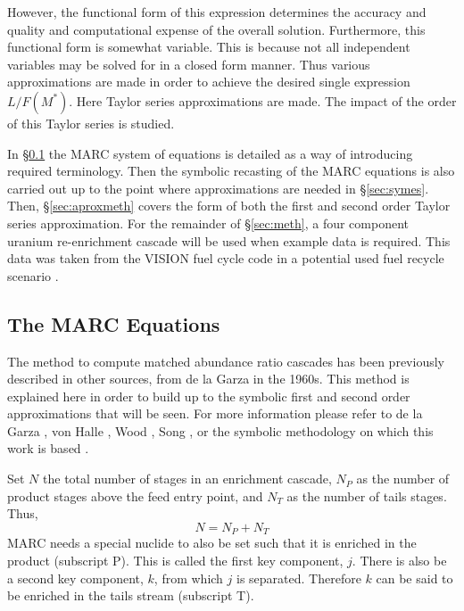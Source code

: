 \documentclass{ansconf}
\begin{document}
However, the functional form of this expression determines the accuracy and 
quality and computational expense of the overall solution.   Furthermore, this 
functional form is somewhat variable.  This is because not all independent variables
may be solved for in a closed form manner.    Thus various approximations are made 
in order to achieve the desired single expression  $L/F(M^*)$.  Here Taylor
series approximations are made.  The impact of the order of this Taylor series
is studied.

In \S \ref{sec:marceq} the MARC system of equations is detailed as a way 
of introducing required terminology. 
Then the symbolic recasting of the MARC equations is also carried out up to the
point where approximations are needed in 
\S \ref{sec:symes}.  Then, \S \ref{sec:aproxmeth} covers the form of both 
the first and second order Taylor series approximation.
For the remainder of \S \ref{sec:meth}, a four component uranium re-enrichment 
cascade will be used when example data is required.  This data was taken from the
VISION fuel cycle code in a potential used fuel recycle scenario \cite{Jacobson2009}.

\subsection{The MARC Equations}
\label{sec:marceq}

The method to compute matched abundance ratio cascades has been 
previously described in other sources, from de la Garza in the
1960s. This method is explained here in order to build up to the symbolic first and 
second order approximations that will be seen.
For more information please refer to de la Garza
\cite{DelaGarza1969}, von Halle \cite{VonHalle1987}, Wood \cite{Wood1999}, 
Song \cite{doi:10.1080/01496391003793884}, or the symbolic methodology on which this 
work is based \cite{Scopatz2012}.

Set $N$ the total number of stages in an enrichment cascade, $N_P$ as the number of 
product stages above the feed entry point, and $N_T$ as the number of tails
stages.  Thus,
\begin{equation}
N = N_P + N_T
\end{equation}
MARC needs a special nuclide to also be set such that it is enriched in the 
product (subscript P).  This is called the first key component, $j$.  
There is also be a second key component, $k$, from which $j$ is 
separated. Therefore $k$ can be said to be enriched in the tails stream (subscript T).
\end{document}
